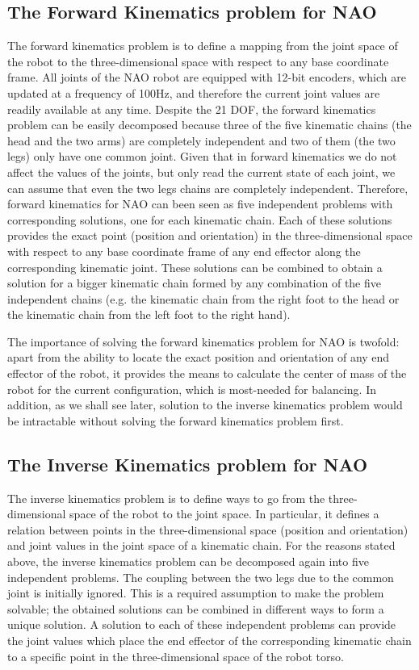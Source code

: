 \subsection{The Forward Kinematics problem for NAO}
The forward kinematics problem is to define a mapping from the joint space of the robot to the three-dimensional space with respect to any base coordinate frame.
All joints of the NAO robot are equipped with 12-bit encoders, which are updated at a frequency of 100Hz, and therefore the current joint values are readily available at any time. Despite the 21 DOF, the forward kinematics problem can be easily decomposed because three of the five kinematic chains (the head and the two arms) are completely independent and two of them (the two legs) only have one common joint. Given that in forward kinematics we do not affect the values of the joints, but only read the current state of each joint, we can assume that even the two legs chains are completely independent. Therefore, forward kinematics for NAO can been seen as five independent problems with corresponding solutions, one for each kinematic chain. Each of these solutions provides the exact point (position and orientation) in the three-dimensional space with respect to any base coordinate frame of any end effector along the corresponding kinematic joint. These solutions can be combined to obtain a solution for a bigger kinematic chain formed by any combination of the five independent chains (e.g. the kinematic chain from the right foot to the head or the kinematic chain from the left foot to the right hand). 

The importance of solving the forward kinematics problem for NAO is twofold: apart from the ability to locate the exact position and orientation of any end effector of the robot, it provides the means to calculate the center of mass of the robot for the current configuration, which is most-needed for balancing. In addition, as we shall see later, solution to the inverse kinematics problem would be intractable without solving the forward kinematics problem first.

\subsection{The Inverse Kinematics problem for NAO}
The inverse kinematics problem is to define ways to go from the three-dimensional space of the robot to the joint space. In particular, it defines a relation between points in the three-dimensional space (position and orientation) and joint values in the joint space of a kinematic chain. For the reasons stated above, the inverse kinematics problem can be decomposed again into five independent problems. The coupling between the two legs due to the common joint is initially ignored. This is a required assumption to make the problem solvable; the obtained solutions can be combined in different ways to form a unique solution. A solution to each of these independent problems can provide the joint values which place the end effector of the corresponding kinematic chain to a specific point in the three-dimensional space of the robot torso. 

